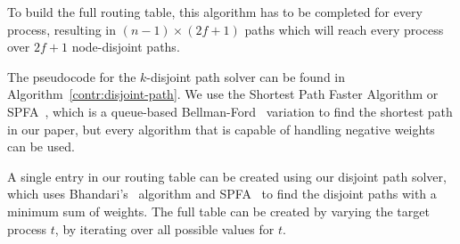 To build the full routing table, this algorithm has to be completed for every process, resulting in $(n-1) \times (2f+1)$ paths which will reach every process over $2f+1$ node-disjoint paths.

The pseudocode for the $k$-disjoint path solver can be found in Algorithm~\ref{contr:disjoint-path}. We use the Shortest Path Faster Algorithm or SPFA~\cite{spfa-moore,spfa-fanding}, which is a queue-based Bellman-Ford~\cite{bf-bellman,bf-ford} variation to find the shortest path in our paper, but every algorithm that is capable of handling negative weights can be used. 

A single entry in our routing table can be created using our disjoint path solver, which uses Bhandari's~\cite{bhandari} algorithm and SPFA~\cite{spfa-moore,spfa-fanding} to find the disjoint paths with a minimum sum of weights. The full table can be created by varying the target process $t$, by iterating over all possible values for $t$.



